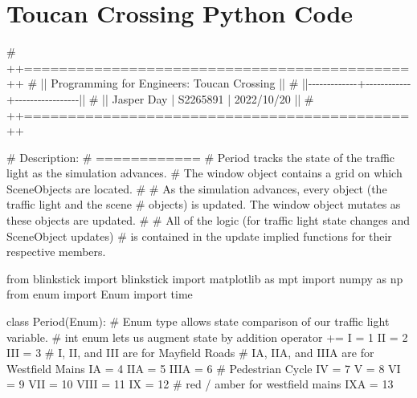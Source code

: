 \documentclass[
  letterpaper,
  DIV=11,
  numbers=noendperiod]{scrartcl}
\newenvironment{Shaded}{\begin{snugshade}}{\end{snugshade}}
\newcommand{\CommentTok}[1]{\textcolor[rgb]{0.37,0.37,0.37}{#1}}
\newcommand{\DecValTok}[1]{\textcolor[rgb]{0.68,0.00,0.00}{#1}}
\newcommand{\ImportTok}[1]{\textcolor[rgb]{0.00,0.46,0.62}{#1}}
\newcommand{\KeywordTok}[1]{\textcolor[rgb]{0.00,0.23,0.31}{#1}}
\newcommand{\NormalTok}[1]{\textcolor[rgb]{0.00,0.23,0.31}{#1}}
\newcommand{\OperatorTok}[1]{\textcolor[rgb]{0.37,0.37,0.37}{#1}}
\begin{document}
\clearpage

\hypertarget{toucan-crossing-python-code}{%
\section{Toucan Crossing Python
Code}\label{toucan-crossing-python-code}}

\begin{Shaded}
\begin{Highlighting}[]
\CommentTok{\# ++============================================++}
\CommentTok{\# || Programming for Engineers: Toucan Crossing ||}
\CommentTok{\# ||{-}{-}{-}{-}{-}{-}{-}{-}{-}{-}{-}{-}{-}+{-}{-}{-}{-}{-}{-}{-}{-}{-}{-}{-}{-}+{-}{-}{-}{-}{-}{-}{-}{-}{-}{-}{-}{-}{-}{-}{-}{-}{-}||}
\CommentTok{\# || Jasper Day  |  S2265891  |  2022/10/20     ||}
\CommentTok{\# ++============================================++}

\CommentTok{\# Description:}
\CommentTok{\# ============}
\CommentTok{\# \textasciigrave{}Period\textasciigrave{} tracks the state of the traffic light as the simulation advances. }
\CommentTok{\# The \textasciigrave{}window\textasciigrave{} object contains a grid on which \textasciigrave{}SceneObjects\textasciigrave{} are located.}
\CommentTok{\# }
\CommentTok{\# As the simulation advances, every object (the traffic light and the scene }
\CommentTok{\# objects) is updated. The \textasciigrave{}window\textasciigrave{} object mutates as these objects are updated.}
\CommentTok{\# }
\CommentTok{\# All of the logic (for traffic light state changes and \textasciigrave{}SceneObject\textasciigrave{} updates) }
\CommentTok{\# is contained in the \textasciigrave{}update\textasciigrave{} implied functions for their respective members.}

\ImportTok{from}\NormalTok{ blinkstick }\ImportTok{import}\NormalTok{ blinkstick}
\ImportTok{import}\NormalTok{ matplotlib }\ImportTok{as}\NormalTok{ mpt}
\ImportTok{import}\NormalTok{ numpy }\ImportTok{as}\NormalTok{ np}
\ImportTok{from}\NormalTok{ enum }\ImportTok{import}\NormalTok{ Enum}
\ImportTok{import}\NormalTok{ time}


\KeywordTok{class}\NormalTok{ Period(Enum):}
    \CommentTok{\# Enum type allows state comparison of our traffic light variable.}
    \CommentTok{\# \textasciigrave{}int\textasciigrave{} enum lets us augment state by addition operator +=}
\NormalTok{    I }\OperatorTok{=} \DecValTok{1}
\NormalTok{    II }\OperatorTok{=} \DecValTok{2}
\NormalTok{    III }\OperatorTok{=} \DecValTok{3}
    \CommentTok{\# I, II, and III are for Mayfield Roads}
    \CommentTok{\# IA, IIA, and IIIA are for Westfield Mains}
\NormalTok{    IA }\OperatorTok{=} \DecValTok{4}
\NormalTok{    IIA }\OperatorTok{=} \DecValTok{5}
\NormalTok{    IIIA }\OperatorTok{=} \DecValTok{6}
    \CommentTok{\# Pedestrian Cycle}
\NormalTok{    IV }\OperatorTok{=} \DecValTok{7}
\NormalTok{    V }\OperatorTok{=} \DecValTok{8}
\NormalTok{    VI }\OperatorTok{=} \DecValTok{9}
\NormalTok{    VII }\OperatorTok{=} \DecValTok{10}
\NormalTok{    VIII }\OperatorTok{=} \DecValTok{11}
\NormalTok{    IX }\OperatorTok{=} \DecValTok{12}
    \CommentTok{\# red / amber for westfield mains}
\NormalTok{    IXA }\OperatorTok{=} \DecValTok{13}


\end{Highlighting}
\end{Shaded}
\end{document}
